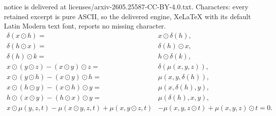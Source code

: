 \documentclass[10pt,a4paper]{amsart}
\begin{document}
notice is delivered at licenses/arxiv-2605.25587-CC-BY-4.0.txt. Characters: every retained excerpt is pure ASCII, so the delivered engine, XeLaTeX with its default Latin Modern text font, reports no missing character.
\begin{align}
    \delta (x \odot h) =~& x \odot \delta (h), \tag{A1} \label{a1}\\
    \delta (h \odot x) =~& \delta (h) \odot x, \tag{A2} \label{a2}\\
    \delta (h) \odot k =~& h \odot \delta (k), \tag{A3} \label{a3}\\
    x \odot (y \odot z) - (x \odot y) \odot z =~& \delta (\mu (x, y, z)), \tag{A4} \label{a4}\\
    x \odot (y \odot h) - (x \odot y) \odot h =~& \mu (x, y, \delta (h)), \tag{A5} \label{a5}\\
    x \odot (h \odot y) - (x \odot h) \odot y =~& \mu (x, \delta (h), y), \tag{A6} \label{a6}\\
    h \odot (x \odot y) - (h \odot x) \odot y =~& \mu (\delta (h), x, y), \tag{A7} \label{a7}\\
    x \odot \mu (y, z, t) - \mu (x \odot y, z, t) + \mu (x, y \odot z, t) &- \mu (x, y, z \odot t) + \mu (x, y, z) \odot t = 0. \tag{A8} \label{a8}
\end{align}
\end{document}
